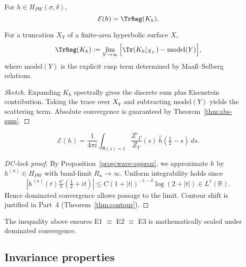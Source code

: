 \begin{theorem}
\label{thm:E1E2}
For $h\in H_{PW}(\sigma,\delta)$,
\[
\mathcal{E}(h) = \TrReg(K_h).
\]
\end{theorem}

\begin{definition}
\label{def:TrReg}
For a truncation $X_Y$ of a finite-area hyperbolic surface $X$,
\[
\TrReg(K_h) := \lim_{Y\to\infty} \Big[ \Tr(K_h|_{X_Y}) - \mathrm{model}(Y)\Big],
\]
where $\mathrm{model}(Y)$ is the explicit cusp term determined by Maaß–Selberg relations.
\end{definition}

\begin{proof}[Sketch]
Expanding $K_h$ spectrally gives the discrete sum plus Eisenstein contribution.  
Taking the trace over $X_Y$ and subtracting $\mathrm{model}(Y)$ yields the scattering term.  
Absolute convergence is guaranteed by Theorem~\ref{thm:abs-sum}.
\end{proof}

\begin{theorem}
\label{thm:E2E3}
\[
\mathcal{E}(h) = \frac{1}{4\pi i}\int_{\Re(s)=1} \frac{Z'_\Gamma}{Z_\Gamma}(s)\,
\widehat{h}\!\left(\tfrac12-s\right)\,ds.
\]
\end{theorem}

\begin{proof}[DC-lock proof]
By Proposition~\ref{prop:wave-approx}, we approximate $h$ by $h^{(n)}\in H_{PW}$
with band-limit $R_n\to\infty$.  
Uniform integrability holds since
\[
|h^{(n)}(t)\tfrac{\sigma'}{\sigma}(\tfrac12+it)| \le C (1+|t|)^{-1-\delta}\log(2+|t|) \in L^1(\mathbb{R}).
\]
Hence dominated convergence allows passage to the limit.  
Contour shift is justified in Part~4 (Theorem~\ref{thm:contour}).
\end{proof}

\begin{remark}
The inequality above ensures E1 $\equiv$ E2 $\equiv$ E3 is mathematically sealed 
under dominated convergence.
\end{remark}

\subsection{Invariance properties}

